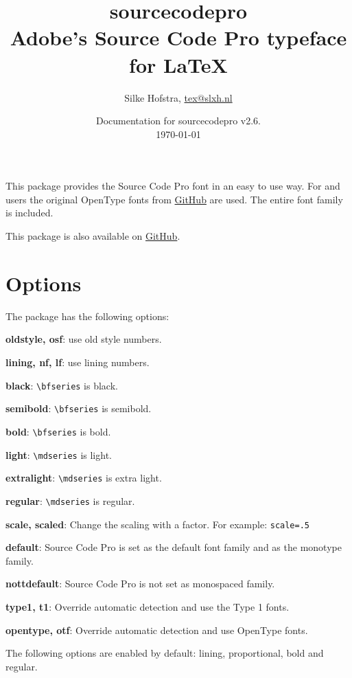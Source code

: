 \documentclass[10pt,a4paper,english]{article}
\title{\bfseries
	\Huge sourcecodepro\\
	\Large Adobe's Source Code Pro typeface for \LaTeX
}
\author{Silke Hofstra, \href{mailto:tex@slxh.nl}{tex@slxh.nl}}
\date{Documentation for sourcecodepro v2.6.\\ \today}
\begin{document}
\maketitle
\begin{multicols}{2}
This package provides the Source Code Pro font in an easy to use way. For  and  users the original OpenType fonts from \href{https://github.com/adobe-fonts/source-code-pro}{GitHub} are used. The entire font family is included.

This package is also available on \href{https://github.com/silkeh/latex-sourcecodepro}{GitHub}.

\section{Options}
The package has the following options:
\begin{itemize*}
	\item \textbf{oldstyle, osf}:  use old style numbers.
	\item \textbf{lining, nf, lf}: use lining numbers.
	\item \textbf{black}:          \texttt{\textbackslash bfseries} is black.
	\item \textbf{semibold}:       \texttt{\textbackslash bfseries} is semibold.
	\item \textbf{bold}:           \texttt{\textbackslash bfseries} is bold.
	\item \textbf{light}:          \texttt{\textbackslash mdseries} is light.
	\item \textbf{extralight}:     \texttt{\textbackslash mdseries} is extra light.
	\item \textbf{regular}:        \texttt{\textbackslash mdseries} is regular.
	\item \textbf{scale, scaled}:  Change the scaling with a factor. For example:  \texttt{scale=.5}
	\item \textbf{default}:        Source Code Pro is set as the default font family and as the monotype family.
	\item \textbf{nottdefault}:    Source Code Pro is not set as monospaced family.
	\item \textbf{type1, t1}:      Override automatic detection and use the Type 1 fonts.
	\item \textbf{opentype, otf}:  Override automatic detection and use OpenType fonts.
\end{itemize*}
The following options are enabled by default: lining, proportional, bold and regular.


\end{multicols}
\end{document}

